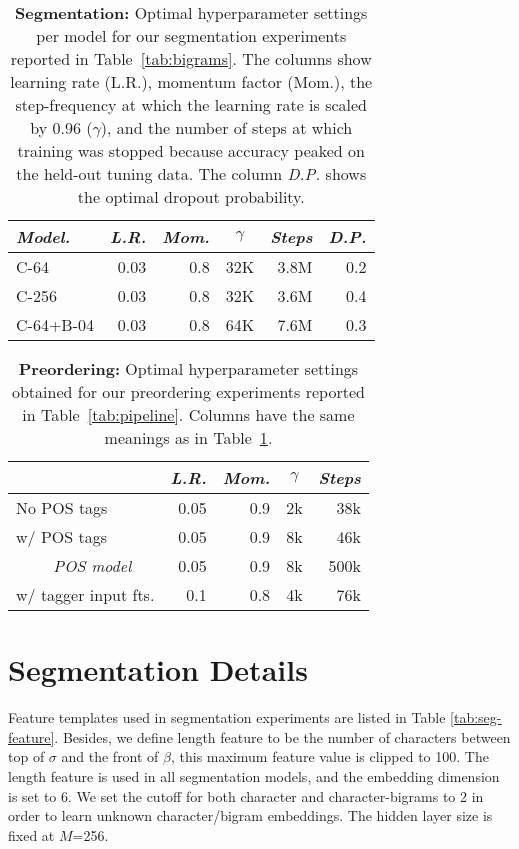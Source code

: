 \documentclass[11pt,letterpaper]{article}
\newcommand{\maincaptionref}{\ref{tab:hyperSegmentation}}
\begin{document}
\begin{table}[htbp]
\begin{tabular}{l|rrrrr}
{\it Model.}   & {\it L.R.} & {\it Mom.}  &  \multicolumn{1}{c}{$\gamma$} & {\it Steps} & {\it D.P.} \\ \hline
C-64 & 0.03 & 0.8 & 32K & 3.8M & 0.2 \\
C-256 & 0.03 & 0.8  & 32K & 3.6M &0.4 \\
C-64+B-04 & 0.03 & 0.8 & 64K & 7.6M  &0.3 \\
\end{tabular}
  \caption{{\bf Segmentation:} Optimal hyperparameter settings per model for our segmentation experiments reported in Table~\ref{tab:bigrams}.
  The columns show learning rate (L.R.), momentum factor (Mom.), the step-frequency at which the learning rate is scaled by 0.96 ($\gamma$),
and the number of steps at which training was stopped because accuracy peaked on the held-out tuning data.
  The column {\it D.P.} shows the optimal dropout probability. }
  \label{tab:hyperSegmentation}
\end{table}

\begin{table}[htbp]
\begin{tabular}{l|rrrr}
  & {\it L.R.} & {\it Mom.} & \multicolumn{1}{c}{$\gamma$} & {\it Steps} \\ \hline
  No POS tags & 0.05 & 0.9 & 2k & 38k \\
  w/ POS tags & 0.05 & 0.9 & 8k & 46k \\
  $\qquad$ \emph{POS model} & 0.05 & 0.9 & 8k & 500k \\
  w/ tagger input fts. & 0.1 & 0.8 & 4k & 76k \\
\end{tabular}
  \caption{{\bf Preordering:} Optimal hyperparameter settings obtained for our preordering experiments reported in Table~\ref{tab:pipeline}.
  Columns have the same meanings as in Table~\maincaptionref.
  }
  \label{tab:hyper-reorder}
\end{table}


\section{Segmentation Details}
Feature templates used in segmentation experiments are listed in Table \ref{tab:seg-feature}.
Besides, we define length feature to be the number of characters between top of $\sigma$ and the front of $\beta$, this maximum feature value is clipped to 100.
The length feature is used in all segmentation models, and the embedding dimension is set to 6. 
We set the cutoff for both character and character-bigrams to 2 in order to learn unknown character/bigram embeddings. 
The hidden layer size is fixed at $M$=256.
\end{document}
